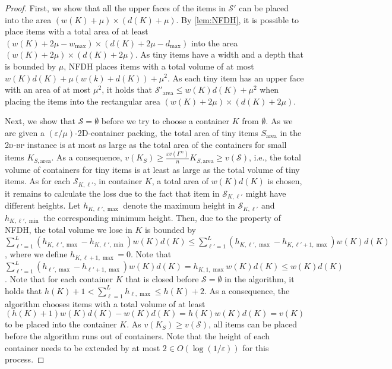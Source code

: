 \documentclass[a4paper,UKenglish,cleveref, autoref, thm-restate]{lipics-v2021}
\newcommand{\eps}{\varepsilon}
\newcommand{\twobp}{\textsc{2d-bp}\xspace}
\newcommand{\tin}{tiny\xspace}
\newcommand{\area}{\mathrm{area}}
\begin{document}
\begin{proof}

First, we show that all the upper faces of the items in $\mathcal{S}'$ can be placed into the area $(w(K) +\mu) \times (d(K)+\mu)$. 
By \cref{lem:NFDH}, it is possible to place items with a total area of at least $(w(K) +2\mu-w_{\max}) \times (d(K)+2\mu-d_{\max})$ into the area $(w(K) +2\mu) \times (d(K)+2\mu)$.
As \tin items have a width and a depth that is bounded by $\mu$, NFDH places items with a total volume of at most $w(K)d(K) + \mu(w(k)+d(K))+\mu^2$. 
As each \tin item has an upper face with an area of at most $\mu^2$, it holds that $\mathcal{S}'_{\area} \leq w(K)d(K) +\mu^2$ when placing the items into the rectangular area 
$(w(K) +2\mu) \times (d(K)+2\mu)$.

Next, we show that $\mathcal{S} = \emptyset$ before we try to choose a container $K$ from $ \emptyset$.
As we are given a $(\eps/\mu)$-2D-container packing, the total area of \tin items $S_{\area}$ in the \twobp instance is at most as large as the total area of the containers for small items $K_{S,\area}$. 
As a consequence, $v(K_S) \geq \frac{\eps v(I^{\infty})}{n} K_{S,\area} \geq v(\mathcal{S})$, i.e., the total volume of containers for \tin items is at least as large as the total volume of \tin items.
As for each $\mathcal{S}_{K,\ell'}$, in container $K$, a total area of $w(K)d(K)$ is chosen, it remains to calculate the loss due to the fact that item in $\mathcal{S}_{K,\ell'}$ might have different heights.
Let $h_{K,\ell',\max}$ denote the maximum height in $\mathcal{S}_{K,\ell'}$ and $h_{K,\ell',\min}$ the corresponding minimum height.
Then, due to the property of NFDH, the total volume we lose in $K$ is bounded by $\sum_{\ell' = 1}^L (h_{K,\ell',\max} - h_{K,\ell',\min}) w(K)d(K) \leq \sum_{\ell' = 1}^L (h_{K,\ell',\max} - h_{K,\ell'+1,\max}) w(K)d(K)$, where we define $h_{K,\ell+1,\max}= 0$.
Note that $\sum_{\ell' = 1}^L (h_{\ell',\max} - h_{\ell'+1,\max}) w(K)d(K) = h_{K,1,\max} w(K)d(K) \leq  w(K)d(K)$.
Note that for each container $K$ that is closed before $\mathcal{S} = \emptyset$ in the algorithm, it holds that $h(K) +1 < \sum_{\ell = 1}^L h_{\ell,\max} \leq h(K) +2$. 
As a consequence, the algorithm chooses items with a total volume of at least $(h(K) +1)w(K)d(K) - w(K)d(K) = h(K)w(K)d(K)= v(K)$ to be placed into the container $K$.
As $v(K_S) \geq v(\mathcal{S})$, all items can be placed before the algorithm runs out of containers. 
Note that the height of each container needs to be extended by at most $2 \in O(\log(1/\eps))$ for this process.


\end{proof}
\end{document}

